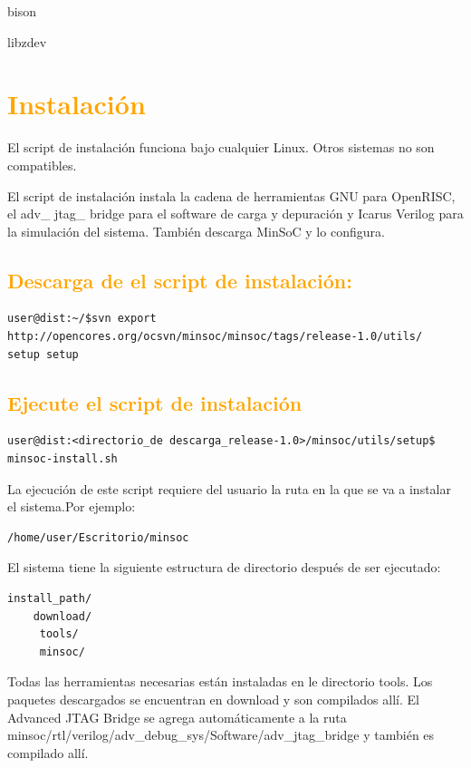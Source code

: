 bison

libz\-dev 


 
\section{\textcolor{orange}{Instalación }}

El script de instalación funciona bajo cualquier Linux. Otros sistemas no son compatibles.

El script de instalación instala la cadena de herramientas GNU para OpenRISC, el adv\_ jtag\_ bridge para el software de carga y depuración y Icarus Verilog para la simulación del sistema. También descarga MinSoC y lo configura.
 

\subsection{\textcolor{orange}{Descarga de el script de instalación:}}

\begin{lstlisting}[breaklines]
 user@dist:~/$svn export http://opencores.org/ocsvn/minsoc/minsoc/tags/release-1.0/utils/
setup setup
\end{lstlisting}

\subsection{\textcolor{orange}{Ejecute el script de instalación}}

\begin{lstlisting}[breaklines]
user@dist:<directorio_de descarga_release-1.0>/minsoc/utils/setup$ minsoc-install.sh
\end{lstlisting}

La ejecución de este script requiere del usuario la ruta en la que se va a instalar el sistema.Por ejemplo:

\begin{lstlisting}[breaklines]
/home/user/Escritorio/minsoc
\end{lstlisting}

El sistema tiene la siguiente estructura de directorio después de ser ejecutado: 
\begin{lstlisting}[breaklines]
install_path/
	download/
	 tools/
 	 minsoc/
\end{lstlisting}

Todas las herramientas necesarias están instaladas en le directorio tools. Los paquetes descargados se encuentran en download y son compilados allí. El Advanced JTAG Bridge se agrega automáticamente a la ruta minsoc/rtl/verilog/adv\_debug\_sys/Software/adv\_jtag\_bridge  y también es compilado allí. 

